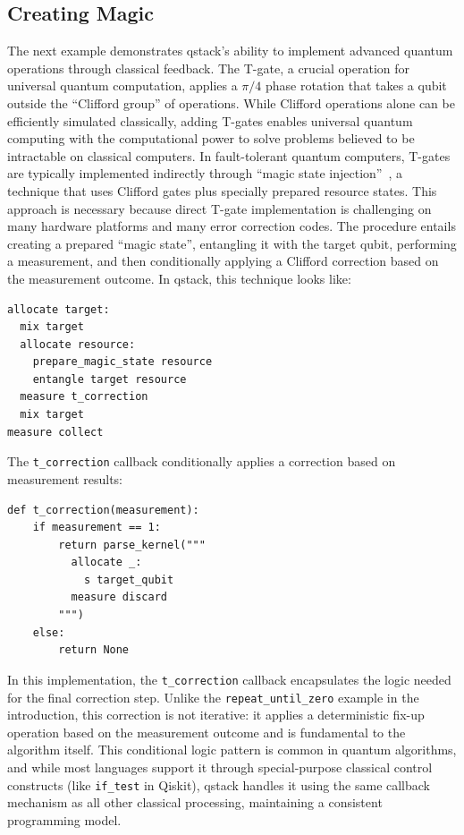 \subsection{Creating Magic}

The next example demonstrates qstack's ability to implement advanced quantum operations through classical feedback. The T-gate, a crucial operation for universal quantum computation, applies a $\pi/4$ phase rotation that takes a qubit outside the ``Clifford group'' of operations. While Clifford operations alone can be efficiently simulated classically, adding T-gates enables universal quantum computing with the computational power to solve problems believed to be intractable on classical computers. In fault-tolerant quantum computers, T-gates are typically implemented indirectly through ``magic state injection''~\cite{bravyi2005universal, Litinski2019gameofsurfacecodes}, a technique that uses Clifford gates plus specially prepared resource states. This approach is necessary because direct T-gate implementation is challenging on many hardware platforms and many error correction codes. The procedure entails creating a prepared ``magic state'', entangling it with the target qubit, performing a measurement, and then conditionally applying a Clifford correction based on the measurement outcome. %
 In qstack, this technique looks like:

\begin{verbatim}
allocate target:
  mix target          
  allocate resource:
    prepare_magic_state resource      
    entangle target resource      
  measure t_correction    
  mix target
measure collect                   
\end{verbatim}

The \texttt{t\_correction} callback conditionally applies a correction based on measurement results:

\begin{verbatim}
def t_correction(measurement):
    if measurement == 1:
        return parse_kernel("""
          allocate _:
            s target_qubit
          measure discard
        """)
    else:
        return None
\end{verbatim}

In this implementation, the \texttt{t\_correction} callback encapsulates the logic needed for the final correction step. Unlike the \texttt{repeat\_until\_zero} example in the introduction, this correction is not iterative: it applies a deterministic fix-up operation based on the measurement outcome and is fundamental to the algorithm itself. This conditional logic pattern is common in quantum algorithms, and while most languages support it through special-purpose classical control constructs (like \texttt{if\_test} in Qiskit), qstack handles it using the same callback mechanism as all other classical processing, maintaining a consistent programming model.

